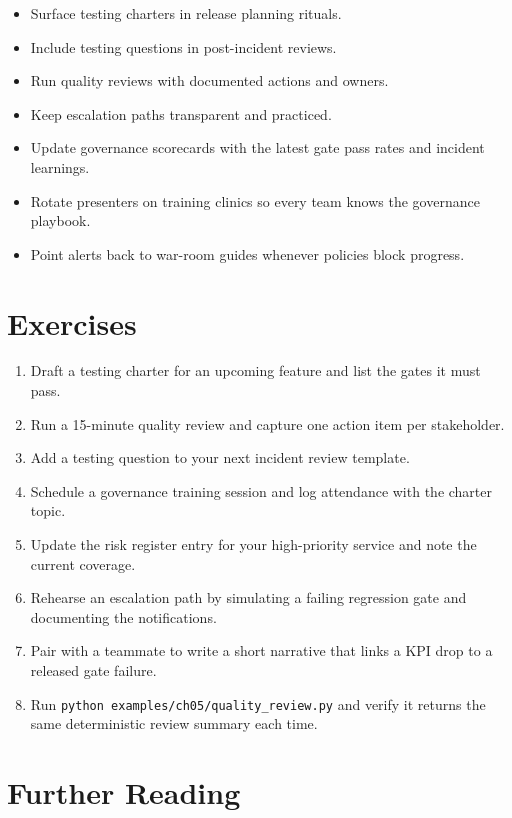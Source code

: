 \begin{itemize}
  \item Surface testing charters in release planning rituals.
  \item Include testing questions in post-incident reviews.
  \item Run quality reviews with documented actions and owners.
  \item Keep escalation paths transparent and practiced.
  \item Update governance scorecards with the latest gate pass rates and incident learnings.
  \item Rotate presenters on training clinics so every team knows the governance playbook.
  \item Point alerts back to war-room guides whenever policies block progress.
\end{itemize}

\section{Exercises}

\begin{enumerate}
  \item Draft a testing charter for an upcoming feature and list the gates it must pass.
  \item Run a 15-minute quality review and capture one action item per stakeholder.
  \item Add a testing question to your next incident review template.
  \item Schedule a governance training session and log attendance with the charter topic.
  \item Update the risk register entry for your high-priority service and note the current coverage.
  \item Rehearse an escalation path by simulating a failing regression gate and documenting the notifications.
  \item Pair with a teammate to write a short narrative that links a KPI drop to a released gate failure.
  \item Run \texttt{python examples/ch05/quality\_review.py} and verify it returns the same deterministic review summary each time.
\end{enumerate}

\section{Further Reading}

